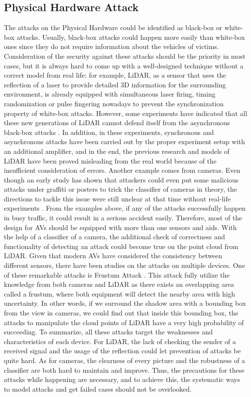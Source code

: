 \documentclass[conference]{IEEEtran}
\begin{document}
\subsection{Physical Hardware Attack}
The attacks on the Physical Hardware could be identified as black-box or white-box attacks. Usually, black-box attacks could happen more easily than white-box ones since they do not require information about the vehicles of victims. Consideration of the security against these attacks should be the priority in most cases, but it is always hard to come up with a well-designed technique without a correct model from real life: for example, LiDAR, as a sensor that uses the reflection of a laser to provide detailed 3D information for the surrounding environment, is already equipped with simultaneous laser firing, timing randomization or pulse fingering nowadays to prevent the synchronization property of white-box attacks\cite{b8,b9,b10}. However, some experiments have indicated that all these new generations of LiDAR cannot defend itself from the asynchronous black-box attacks \cite{b2}. In addition, in these experiments, synchronous and asynchronous attacks have been carried out by the proper experiment setup with an additional amplifier, and in the end, the previous research and models of LiDAR have been proved misleading from the real world because of the insufficient consideration of errors. Another example comes from cameras. Even though an early study has shown that attackers could even put some malicious attacks under graffiti or posters to trick the classifier of cameras in theory, the directions to tackle this issue were still unclear at that time without real-life experiments \cite{b5}. From the examples above, if any of the attacks successfully happen in busy traffic, it could result in a serious accident easily. Therefore, most of the design for AVs should be equipped with more than one sensors and aids. With the help of a classifier of a camera, the additional check of correctness and functionality of detecting an attack could become true on the point cloud from LiDAR.  Given that modern AVs have considered the consistency between different sensors, there have been studies on the attacks on multiple devices. One of these remarkable attacks is Frustum Attack \cite{b1}. This attack fully utilize the knowledge from both cameras and LiDAR as there exists an overlapping area called a frustum, where both equipment will detect the nearby area with high uncertainty. In other words, if we surround the shadow area with a bounding box from the view in cameras, we could find out that inside this bounding box, the attacks to manipulate the cloud points of LiDAR have a very high probability of succeeding. To summarize, all these attacks target the weaknesses and characteristics of each device. For LiDAR, the lack of checking the sender of a received signal and the usage of the reflection could let prevention of attacks be quite hard. As for cameras, the clearness of every picture and the robustness of a classifier are both hard to maintain and improve. Thus, the precautions for these attacks while happening are necessary, and to achieve this, the systematic ways to model attacks and get failed cases should not be overlooked.
\end{document}
